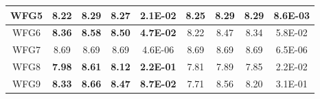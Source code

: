 \begin{table}[t]
\begin{center}
\begin{scriptsize}
\begin{tabular}{ccccccccc}
\multicolumn{1}{|c|}{WFG5} & \multicolumn{1}{c|}{8.22}           & \multicolumn{1}{c|}{8.29}           & \multicolumn{1}{c|}{8.27}           & \multicolumn{1}{c|}{2.1E-02}          & \multicolumn{1}{c|}{\textbf{8.25}} & \multicolumn{1}{c|}{\textbf{8.29}} & \multicolumn{1}{c|}{\textbf{8.29}} & \multicolumn{1}{c|}{\textbf{8.6E-03}} \\ \hline
\multicolumn{1}{|c|}{WFG6} & \multicolumn{1}{c|}{\textbf{8.36}}  & \multicolumn{1}{c|}{\textbf{8.58}}  & \multicolumn{1}{c|}{\textbf{8.50}}  & \multicolumn{1}{c|}{\textbf{4.7E-02}} & \multicolumn{1}{c|}{8.22}          & \multicolumn{1}{c|}{8.47}          & \multicolumn{1}{c|}{8.34}          & \multicolumn{1}{c|}{5.8E-02}          \\ \hline
\multicolumn{1}{|c|}{WFG7} & \multicolumn{1}{c|}{8.69}           & \multicolumn{1}{c|}{8.69}           & \multicolumn{1}{c|}{8.69}           & \multicolumn{1}{c|}{4.6E-06}          & \multicolumn{1}{c|}{8.69}          & \multicolumn{1}{c|}{8.69}          & \multicolumn{1}{c|}{8.69}          & \multicolumn{1}{c|}{6.5E-06}          \\ \hline
\multicolumn{1}{|c|}{WFG8} & \multicolumn{1}{c|}{\textbf{7.98}}  & \multicolumn{1}{c|}{\textbf{8.61}}  & \multicolumn{1}{c|}{\textbf{8.12}}  & \multicolumn{1}{c|}{\textbf{2.2E-01}} & \multicolumn{1}{c|}{7.81}          & \multicolumn{1}{c|}{7.89}          & \multicolumn{1}{c|}{7.85}          & \multicolumn{1}{c|}{2.2E-02}          \\ \hline
\multicolumn{1}{|c|}{WFG9} & \multicolumn{1}{c|}{\textbf{8.33}}  & \multicolumn{1}{c|}{\textbf{8.66}}  & \multicolumn{1}{c|}{\textbf{8.47}}  & \multicolumn{1}{c|}{\textbf{8.7E-02}} & \multicolumn{1}{c|}{7.71}          & \multicolumn{1}{c|}{8.56}          & \multicolumn{1}{c|}{8.20}          & \multicolumn{1}{c|}{3.1E-01}          \\ \hline
\end{tabular}
\end{scriptsize}
\end{center}
\end{table}


